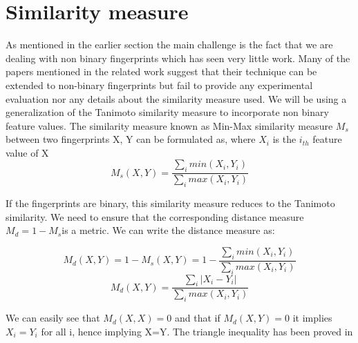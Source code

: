 \section{Similarity measure}

As mentioned in the earlier section the main challenge is the fact that we are dealing with non binary fingerprints which has seen very little work. Many of the papers mentioned in the related work suggest that their technique can be extended to non-binary fingerprints but fail to provide any experimental evaluation nor any details about the similarity measure used. We will be using a generalization of the Tanimoto similarity measure to incorporate non binary feature values. The similarity measure known as Min-Max similarity measure $M_s$ between two fingerprints X, Y can be formulated as, where $X_i$ is the $i_{th}$ feature value of X \[ M_s(X,Y) = \frac{\sum \limits_{i} min(X_i, Y_i)}{\sum \limits_{i} max(X_i, Y_i)}\]

If the fingerprints are binary, this similarity measure reduces to the Tanimoto similarity. We need to ensure that the corresponding distance measure $M_d=1- M_s$is a metric. We can write the distance measure as: 

\[ M_d(X,Y) = 1- M_s(X,Y) = 1- \frac{\sum \limits_{i} min(X_i, Y_i)}{\sum \limits_{i} max(X_i, Y_i)}\]
\[ M_d(X,Y)= \frac{\sum \limits_{i} |X_i - Y_i|}{\sum \limits_{i} max(X_i, Y_i)}\]

We can easily see that $M_d(X,X)=0$ and that if $M_d(X,Y)=0 $ it implies $X_i = Y_i$ for all i, hence implying X=Y. The triangle inequality has been proved in \citet*{lipkus1999proof}




